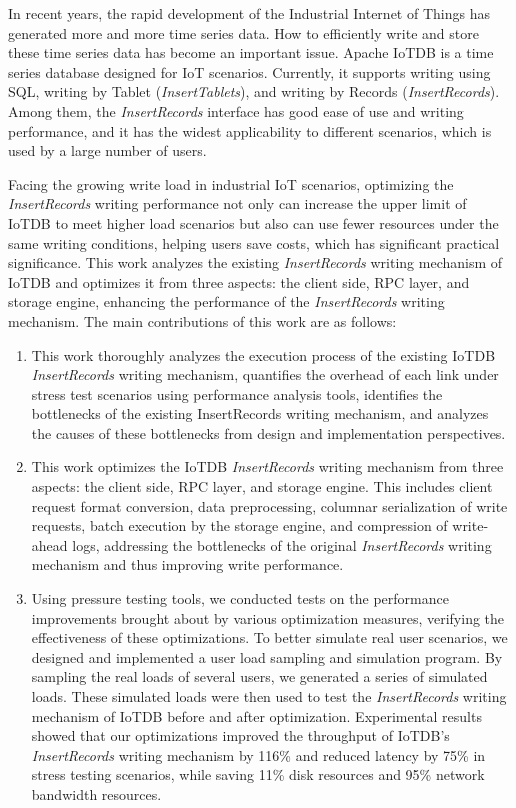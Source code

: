 \begin{abstract*}

  In recent years, the rapid development of the Industrial Internet of Things has generated more and more time series data. How to efficiently write and store these time series data has become an important issue. Apache IoTDB is a time series database designed for IoT scenarios. Currently, it supports writing using SQL, writing by Tablet (\emph{InsertTablets}), and writing by Records (\emph{InsertRecords}). Among them, the \emph{InsertRecords} interface has good ease of use and writing performance, and it has the widest applicability to different scenarios, which is used by a large number of users.

Facing the growing write load in industrial IoT scenarios, optimizing the \emph{InsertRecords} writing performance not only can increase the upper limit of IoTDB to meet higher load scenarios but also can use fewer resources under the same writing conditions, helping users save costs, which has significant practical significance. This work analyzes the existing \emph{InsertRecords} writing mechanism of IoTDB and optimizes it from three aspects: the client side, RPC layer, and storage engine, enhancing the performance of the \emph{InsertRecords} writing mechanism. The main contributions of this work are as follows:
\begin{enumerate}
  \item This work thoroughly analyzes the execution process of the existing IoTDB \emph{InsertRecords} writing mechanism, quantifies the overhead of each link under stress test scenarios using performance analysis tools, identifies the bottlenecks of the existing InsertRecords writing mechanism, and analyzes the causes of these bottlenecks from design and implementation perspectives.
  \item This work optimizes the IoTDB \emph{InsertRecords} writing mechanism from three aspects: the client side, RPC layer, and storage engine. This includes client request format conversion, data preprocessing, columnar serialization of write requests, batch execution by the storage engine, and compression of write-ahead logs, addressing the bottlenecks of the original \emph{InsertRecords} writing mechanism and thus improving write performance.
  \item Using pressure testing tools, we conducted tests on the performance improvements brought about by various optimization measures, verifying the effectiveness of these optimizations. To better simulate real user scenarios, we designed and implemented a user load sampling and simulation program. By sampling the real loads of several users, we generated a series of simulated loads. These simulated loads were then used to test the \emph{InsertRecords} writing mechanism of IoTDB before and after optimization. Experimental results showed that our optimizations improved the throughput of IoTDB's \emph{InsertRecords} writing mechanism by 116\% and reduced latency by 75\% in stress testing scenarios, while saving 11\% disk resources and 95\% network bandwidth resources.

\end{enumerate}
\end{abstract*}

